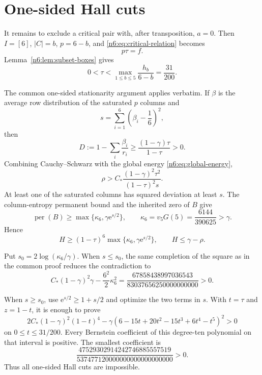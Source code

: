 \documentclass[11pt]{article}
\numberwithin{equation}{section}
\theoremstyle{definition}
\newcommand{\per}{\operatorname{per}}
\newcommand{\e}{\mathrm e}
\begin{document}
\section{One-sided Hall cuts}\label{n6:sec:one-sided}

It remains to exclude a critical pair with, after transposition, $a=0$.  Then
$I=[6]$, $|C|=b$, $p=6-b$, and \eqref{n6:eq:critical-relation} becomes
\[
 p\tau=f.
\]
Lemma~\ref{n6:lem:subset-boxes} gives
\begin{equation}
 0<\tau<\max_{1\le b\le5}\frac{h_b}{6-b}
 =\frac{31}{200}.\label{n6:eq:one-sided-tau}
\end{equation}

The common one-sided stationarity argument applies verbatim.  If $\beta$ is
the average row distribution of the saturated $p$ columns and
\[
 s=\sum_{i=1}^6\left(\beta_i-\frac16\right)^2,
\]
then
\begin{equation}
 D:=1-\sum_i\frac{\beta_i}{r_i}
 \ge\frac{(1-\gamma)\tau}{1-\tau}>0.\label{n6:eq:one-sided-D}
\end{equation}
Combining Cauchy--Schwarz with the global energy
\eqref{n6:eq:global-energy},
\begin{equation}
 \rho>
 C_*\frac{(1-\gamma)^2\tau^2}{(1-\tau)^2s}.\label{n6:eq:one-sided-rho}
\end{equation}
At least one of the saturated columns has squared deviation at least $s$.
The column-entropy permanent bound and the inherited zero of $B$ give
\begin{equation}
 \per(B)\ge\max\{\kappa_6,\gamma\e^{s/2}\},
 \qquad
 \kappa_6=v_5G(5)=\frac{6144}{390625}>\gamma.\label{n6:eq:one-sided-perB}
\end{equation}
Hence
\begin{equation}
 H\ge(1-\tau)^6\max\{\kappa_6,\gamma\e^{s/2}\},
 \qquad
 H\le\gamma-\rho.\label{n6:eq:one-sided-sandwich}
\end{equation}

Put $s_0=2\log(\kappa_6/\gamma)$.  When $s\le s_0$, the same completion of the
square as in the common proof reduces the contradiction to
\begin{equation}
 C_*(1-\gamma)^2\gamma-\frac{6^2}{2}\kappa_6^2
 =
 \frac{67858438997036543}
 {83037656250000000000}>0.\label{n6:eq:small-entropy}
\end{equation}

When $s\ge s_0$, use $\e^{s/2}\ge1+s/2$ and optimize the two terms in $s$.
With $t=\tau$ and $z=1-t$, it is enough to prove
\begin{equation}
 2C_*(1-\gamma)^2(1-t)^4
 -\gamma\left(6-15t+20t^2-15t^3+6t^4-t^5\right)^2>0\label{n6:eq:large-poly}
\end{equation}
on $0\le t\le31/200$.  Every Bernstein coefficient of this degree-ten
polynomial on that interval is positive.  The smallest coefficient is
\begin{equation}
 \frac{47529302914242746885557519}
 {537477120000000000000000000}>0.\label{n6:eq:large-min}
\end{equation}
Thus all one-sided Hall cuts are impossible.
\end{document}

